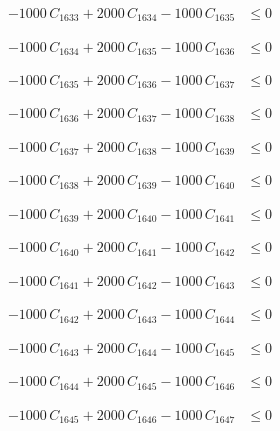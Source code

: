 \documentclass[a4paper,11pt]{article}
\begin{document}
\begin{align}
-1000\,C_{1633} + 2000\,C_{1634} - 1000\,C_{1635} &\leq 0 \nonumber
\end{align}

\begin{align}
-1000\,C_{1634} + 2000\,C_{1635} - 1000\,C_{1636} &\leq 0 \nonumber
\end{align}

\begin{align}
-1000\,C_{1635} + 2000\,C_{1636} - 1000\,C_{1637} &\leq 0 \nonumber
\end{align}

\begin{align}
-1000\,C_{1636} + 2000\,C_{1637} - 1000\,C_{1638} &\leq 0 \nonumber
\end{align}

\begin{align}
-1000\,C_{1637} + 2000\,C_{1638} - 1000\,C_{1639} &\leq 0 \nonumber
\end{align}

\begin{align}
-1000\,C_{1638} + 2000\,C_{1639} - 1000\,C_{1640} &\leq 0 \nonumber
\end{align}

\begin{align}
-1000\,C_{1639} + 2000\,C_{1640} - 1000\,C_{1641} &\leq 0 \nonumber
\end{align}

\begin{align}
-1000\,C_{1640} + 2000\,C_{1641} - 1000\,C_{1642} &\leq 0 \nonumber
\end{align}

\begin{align}
-1000\,C_{1641} + 2000\,C_{1642} - 1000\,C_{1643} &\leq 0 \nonumber
\end{align}

\begin{align}
-1000\,C_{1642} + 2000\,C_{1643} - 1000\,C_{1644} &\leq 0 \nonumber
\end{align}

\begin{align}
-1000\,C_{1643} + 2000\,C_{1644} - 1000\,C_{1645} &\leq 0 \nonumber
\end{align}

\begin{align}
-1000\,C_{1644} + 2000\,C_{1645} - 1000\,C_{1646} &\leq 0 \nonumber
\end{align}

\begin{align}
-1000\,C_{1645} + 2000\,C_{1646} - 1000\,C_{1647} &\leq 0 \nonumber
\end{align}
\end{document}
